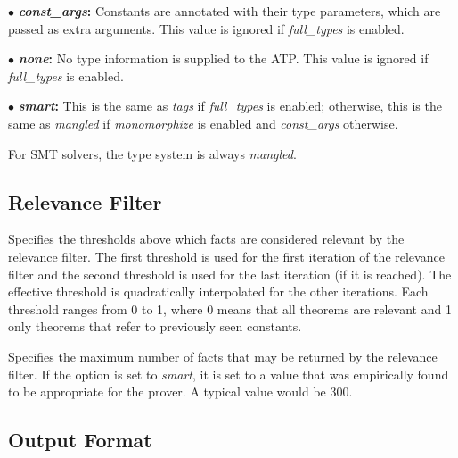 \documentclass[a4paper,12pt]{article}
\begin{document}
\begin{enum}
\begin{enum}
\item[$\bullet$] \textbf{\textit{const\_args}:} Constants are annotated with
their type parameters, which are passed as extra arguments. This value is
ignored if \textit{full\_types} is enabled.

\item[$\bullet$] \textbf{\textit{none}:} No type information is supplied to the
ATP. This value is ignored if \textit{full\_types} is enabled.

\item[$\bullet$] \textbf{\textit{smart}:} This is the same as
\textit{tags} if \textit{full\_types} is enabled; otherwise, this is the
same as \textit{mangled} if \textit{monomorphize} is enabled and
\textit{const\_args} otherwise.
\end{enum}

For SMT solvers, the type system is always \textit{mangled}.
\end{enum}

\subsection{Relevance Filter}
\label{relevance-filter}

\begin{enum}
Specifies the thresholds above which facts are considered relevant by the
relevance filter. The first threshold is used for the first iteration of the
relevance filter and the second threshold is used for the last iteration (if it
is reached). The effective threshold is quadratically interpolated for the other
iterations. Each threshold ranges from 0 to 1, where 0 means that all theorems
are relevant and 1 only theorems that refer to previously seen constants.

Specifies the maximum number of facts that may be returned by the relevance
filter. If the option is set to \textit{smart}, it is set to a value that was
empirically found to be appropriate for the prover. A typical value would be
300.

\end{enum}

\subsection{Output Format}
\label{output-format}
\end{document}
